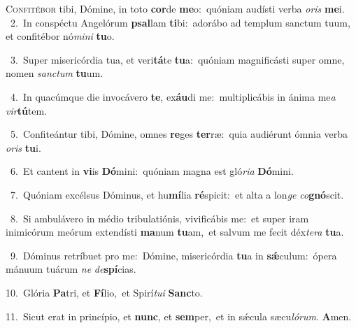 \lettrine{\initial\textcolor{\initialcolor}{C}}{onfitébor} tibi, Dómine, in toto \textbf{cor}\-de \textbf{me}\-o:~\star quóniam audísti verba \textit{o}\-\textit{ris} \textbf{me}\-i.\\
{\numbfont\textcolor{\numbcolor}{~2.}}~In conspéctu Angelórum \textbf{psal}\-lam \textbf{ti}\-bi:~\star adorábo ad templum sanctum tuum, et confitébor nó\-\textit{mi}\-\textit{ni} \textbf{tu}\-o.\par
{\numbfont\textcolor{\numbcolor}{~3.}}~Super misericórdia tua, et veri\-\textbf{tá}\-te \textbf{tu}\-a:~\star quóniam magnificásti super omne, nomen \textit{sanc}\-\textit{tum} \textbf{tu}\-um.\par
{\numbfont\textcolor{\numbcolor}{~4.}}~In quacúmque die invocávero \textbf{te}\-, ex\-\textbf{áu}\-di me:~\star multiplicábis in ánima me\textit{a} \textit{vir}\-\textbf{tú}tem.\par
{\numbfont\textcolor{\numbcolor}{~5.}}~Confiteántur tibi, Dómine, omnes \textbf{re}\-ges \textbf{ter}\-ræ:~\star quia audiérunt ómnia verba \textit{o}\-\textit{ris} \textbf{tu}\-i.\par
{\numbfont\textcolor{\numbcolor}{~6.}}~Et cantent in \textbf{vi}\-is \textbf{Dó}\-mini:~\star quóniam magna est gló\-\textit{ri}\-\textit{a} \textbf{Dó}\-mini.\par
{\numbfont\textcolor{\numbcolor}{~7.}}~Quóniam excélsus Dóminus, et hu\-\textbf{mí}\-lia \textbf{ré}\-spicit:~\star et alta a lon\textit{ge} \textit{co}\-\textbf{gnó}scit.\par
{\numbfont\textcolor{\numbcolor}{~8.}}~Si ambulávero in médio tribulatiónis, vivificábis me:~\dagger et super iram inimicórum meórum extendísti \textbf{ma}\-num \textbf{tu}\-am,~\star et salvum me fecit déx\-\textit{te}\-\textit{ra} \textbf{tu}\-a.\par
{\numbfont\textcolor{\numbcolor}{~9.}}~Dóminus retríbuet pro me:~\dagger Dómine, misericórdia \textbf{tu}\-a in \textbf{sǽ}\-culum:~\star ópera mánuum tuárum \textit{ne} \textit{de}\-\textbf{spí}cias.\par
{\numbfont\textcolor{\numbcolor}{10.}}~Glória \textbf{Pa}\-tri, et \textbf{Fí}\-lio,~\star et Spirí\-\textit{tu}\-\textit{i} \textbf{Sanc}\-to.\par
{\numbfont\textcolor{\numbcolor}{11.}}~Sicut erat in princípio, et \textbf{nunc}\-, et \textbf{sem}\-per,~\star et in sǽcula sæcu\-\textit{ló}\-\textit{rum}. \textbf{A}\-men.\par

